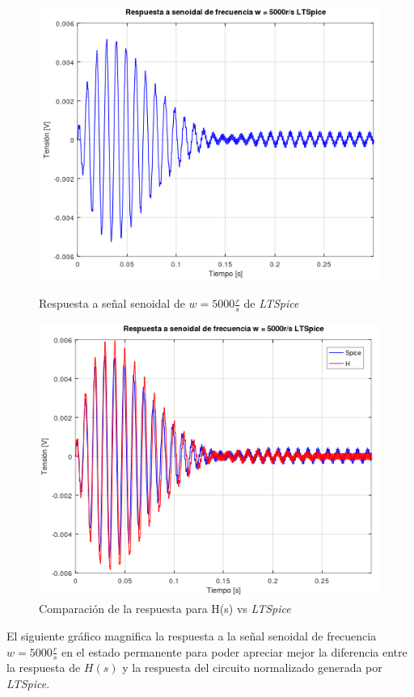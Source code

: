 \documentclass[11pt,a4paper]{report}
\begin{document}
\begin{figure}[h!]
\centering
\includegraphics[scale=1]{rtaSenoidalAltoSpice.png}
\caption{Respuesta a señal senoidal de $w = 5000 \frac{r}{s}$ de \textit{LTSpice}}
\includegraphics[scale=0.96]{rtaSenoidalAltoSpiceComp.png}
\caption{Comparación de la respuesta para H(s) vs \textit{LTSpice}}
\end{figure}
\clearpage

El siguiente gráfico magnifica la respuesta a la señal senoidal de frecuencia $w = 5000 \frac{r}{s}$ en el estado permanente para poder apreciar mejor la diferencia entre la respuesta de $H(s)$ y la respuesta del circuito normalizado generada por \textit{LTSpice}.
\end{document}
